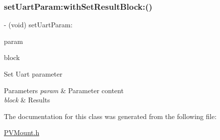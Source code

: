 \subsubsection{\texorpdfstring{set\+Uart\+Param\+:with\+Set\+Result\+Block\+:()}{setUartParam:withSetResultBlock:()}}
{\footnotesize\ttfamily -\/ (void) set\+Uart\+Param\+: \begin{DoxyParamCaption}\item[{(\hyperlink{struct_p_v_s_d_k___m_o_u_n_t_a_p_i___u_a_r_t___p_a_r_a_m}{P\+V\+S\+D\+K\+\_\+\+M\+O\+U\+N\+T\+A\+P\+I\+\_\+\+U\+A\+R\+T\+\_\+\+P\+A\+R\+AM})}]{param }\item[{withSetResultBlock:(P\+V\+Set\+Param\+Result\+Block)}]{block }\end{DoxyParamCaption}}

Set Uart parameter


\begin{DoxyParams}{Parameters}
{\em param} & Parameter content \\
\hline
{\em block} & Results \\
\hline
\end{DoxyParams}


The documentation for this class was generated from the following file\+:\begin{DoxyCompactItemize}
\item 
\hyperlink{_p_v_mount_8h}{P\+V\+Mount.\+h}\end{DoxyCompactItemize}
